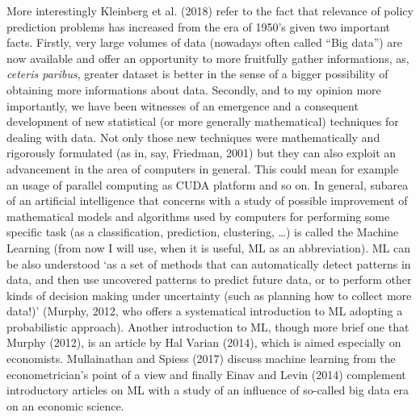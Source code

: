 \documentclass[12pt, twoside]{book} %
\begin{document}
More interestingly Kleinberg et al. (2018) refer to the fact that relevance of policy prediction problems has increased from the era of 1950's given two important facts. Firstly, very large volumes of data (nowadays often called “Big data”) are now available and offer an opportunity to more fruitfully gather informations, as, \textit{ceteris paribus}, greater dataset is better in the sense of a bigger possibility of obtaining more informations about data. Secondly, and to my opinion more importantly, we have been witnesses of an emergence and a consequent development of new statistical (or more generally mathematical) techniques for dealing with data. Not only those new techniques were mathematically and rigorously formulated (as in, say, Friedman, 2001) but they can also exploit an advancement in the area of computers in general. This could mean for example an usage of parallel computing as CUDA platform and so on. In general, subarea of an artificial intelligence that concerns with a study of possible improvement of mathematical models and algorithms used by computers for performing some specific task (as a classification, prediction, clustering, \ldots) is called the Machine Learning (from now I will use, when it is useful, ML as an abbreviation). ML can be also understood ‘as a set of methods that can automatically detect patterns in data, and then use uncovered patterns to predict future data, or to perform other kinds of decision making under uncertainty (such as planning how to collect more data!)’ (Murphy, 2012, who offers a systematical introduction to ML adopting a probabilistic approach). Another introduction to ML, though more brief one that Murphy (2012), is an article by Hal Varian (2014), which is aimed especially on economists. Mullainathan and Spiess (2017) discuss machine learning from the econometrician's point of a view and finally Einav and Levin (2014) complement introductory articles on ML with a study of an influence of so-called big data era on an economic science. \newline
\end{document}
